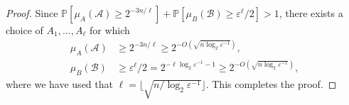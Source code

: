 \documentclass[10pt,a4paper]{amsart}
\def\Pb{\mathbb{P}}
\def\cA{\mathcal{A}}
\def\cB{\mathcal{B}}
\def\eps{\varepsilon}
\begin{document}
\begin{proof}
Since $\Pb[\mu_A(\cA)\geq 2^{-3n/\ell}]+\Pb[\mu_B(\cB)\geq \eps^\ell/2]>1$, there exists a choice of $A_1,\dots,A_\ell$ for which 
\begin{align*}
\mu_A(\cA)&\geq 2^{-3n/\ell}\geq 2^{-O(\sqrt{n\log_2\eps^{-1}})},\\
\mu_B(\cB)&\geq \eps^\ell /2=2^{-\ell\log_2\eps^{-1}-1}\geq 2^{-O(\sqrt{n\log_2\eps^{-1}})},
\end{align*}
where we have used that $\ell=\lfloor \sqrt{n/\log_2\eps^{-1}}\rfloor$. This completes the proof.
\end{proof}
\end{document}
